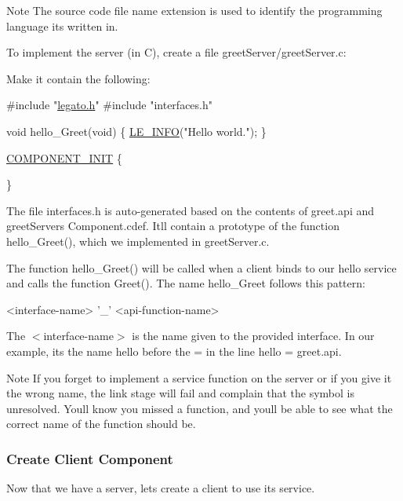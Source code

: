\begin{DoxyNote}{Note}
The source code file name extension is used to identify the programming language it\textquotesingle{}s written in.
\end{DoxyNote}
To implement the server (in C), create a file {\ttfamily greet\+Server/greet\+Server.\+c}\+:



Make it contain the following\+:


\begin{DoxyCode}
\textcolor{preprocessor}{#include "\hyperlink{legato_8h}{legato.h}"}
\textcolor{preprocessor}{#include "interfaces.h"}

\textcolor{keywordtype}{void} hello\_Greet(\textcolor{keywordtype}{void})
\{
    \hyperlink{le__log_8h_a23e6d206faa64f612045d688cdde5808}{LE\_INFO}(\textcolor{stringliteral}{"Hello world."});
\}

\hyperlink{le__event_loop_8h_abdb9187a56836a93d19cc793cbd4b7ec}{COMPONENT\_INIT}
\{

\}
\end{DoxyCode}


The file {\ttfamily interfaces.\+h} is auto-\/generated based on the contents of {\ttfamily greet.\+api} and greet\+Server\textquotesingle{}s {\ttfamily Component.\+cdef}. It\textquotesingle{}ll contain a prototype of the function {\ttfamily hello\+\_\+\+Greet()}, which we implemented in {\ttfamily greet\+Server.\+c}.

The function {\ttfamily hello\+\_\+\+Greet()} will be called when a client binds to our {\ttfamily hello} service and calls the function {\ttfamily Greet()}. The name {\ttfamily hello\+\_\+\+Greet} follows this pattern\+:

\begin{DoxyVerb}<interface-name> '_' <api-function-name>
\end{DoxyVerb}


The $<$interface-\/name$>$ is the name given to the provided interface. In our example, it\textquotesingle{}s the name {\ttfamily hello} before the {\ttfamily =} in the line {\ttfamily hello} {\ttfamily =} {\ttfamily greet.\+api}.

\begin{DoxyNote}{Note}
If you forget to implement a service function on the server or if you give it the wrong name, the link stage will fail and complain that the symbol is unresolved. You\textquotesingle{}ll know you missed a function, and you\textquotesingle{}ll be able to see what the correct name of the function should be.
\end{DoxyNote}
\hypertarget{basic_apps_i_p_c_basicAppsIPC_helloIPCCreatingTheClient}{}\subsubsection{Create Client Component}\label{basic_apps_i_p_c_basicAppsIPC_helloIPCCreatingTheClient}
Now that we have a server, let\textquotesingle{}s create a client to use its service.

